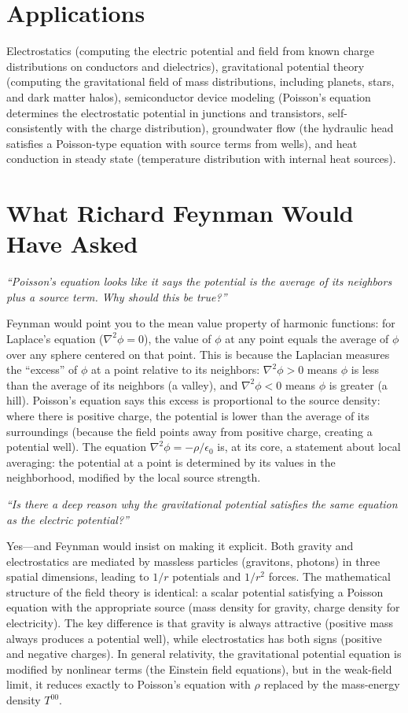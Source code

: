 \documentclass[11pt,openright]{book}
\begin{document}
\section*{Applications}

Electrostatics (computing the electric potential and field from known charge distributions on conductors and dielectrics), gravitational potential theory (computing the gravitational field of mass distributions, including planets, stars, and dark matter halos), semiconductor device modeling (Poisson's equation determines the electrostatic potential in junctions and transistors, self-consistently with the charge distribution), groundwater flow (the hydraulic head satisfies a Poisson-type equation with source terms from wells), and heat conduction in steady state (temperature distribution with internal heat sources).
\section*{What Richard Feynman Would Have Asked}

\textit{``Poisson's equation looks like it says the potential is the average of its neighbors plus a source term. Why should this be true?''}

Feynman would point you to the mean value property of harmonic functions: for Laplace's equation ($\nabla^2\phi = 0$), the value of $\phi$ at any point equals the average of $\phi$ over any sphere centered on that point. This is because the Laplacian measures the ``excess'' of $\phi$ at a point relative to its neighbors: $\nabla^2\phi > 0$ means $\phi$ is less than the average of its neighbors (a valley), and $\nabla^2\phi < 0$ means $\phi$ is greater (a hill). Poisson's equation says this excess is proportional to the source density: where there is positive charge, the potential is lower than the average of its surroundings (because the field points away from positive charge, creating a potential well). The equation $\nabla^2\phi = -\rho/\epsilon_0$ is, at its core, a statement about local averaging: the potential at a point is determined by its values in the neighborhood, modified by the local source strength.

\textit{``Is there a deep reason why the gravitational potential satisfies the same equation as the electric potential?''}

Yes---and Feynman would insist on making it explicit. Both gravity and electrostatics are mediated by massless particles (gravitons, photons) in three spatial dimensions, leading to $1/r$ potentials and $1/r^2$ forces. The mathematical structure of the field theory is identical: a scalar potential satisfying a Poisson equation with the appropriate source (mass density for gravity, charge density for electricity). The key difference is that gravity is always attractive (positive mass always produces a potential well), while electrostatics has both signs (positive and negative charges). In general relativity, the gravitational potential equation is modified by nonlinear terms (the Einstein field equations), but in the weak-field limit, it reduces exactly to Poisson's equation with $\rho$ replaced by the mass-energy density $T^{00}$.
\end{document}
